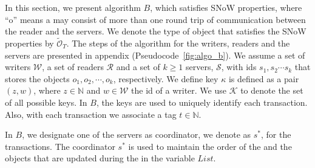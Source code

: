 In this section,  we present  algorithm  $B$, which satisfies  SNoW  properties, where ``o'' means a \rot{} may consist of more than one round trip of communication between the reader and the servers. We denote the type of object  that satisfies the SNoW properties by $\tilde{\mathcal{O}}_T$.   
The steps of the algorithm for the writers, readers and the servers  are presented in appendix (Pseudocode~\ref{fig:algo_b}).
We assume  a set of writers $\mathcal{W}$,  a set of readers $\mathcal{R}$ and a set of $k \geq 1$ servers,  $\mathcal{S}$, with ids $s_1, s_2\cdots s_k$ that stores the objects $o_1, o_2, \cdots, o_k$, respectively.  We define  key ${\kappa}$ is defined as a pair $(z, w)$, 
where $z \in \mathbb{N}$ and $w \in \mathcal{W}$ the  id of a writer. We use $\mathcal{K}$ to denote the set of all possible keys. 
In $B$, the keys are used to uniquely identify each transaction. Also, with each transaction we associate a tag $t \in \mathbb{N}$. 
	
In  $B$, we designate one of the servers as coordinator, we denote as $s^*$,
 for the transactions. The coordinator $s^*$ is used to maintain the order of the \wots{} and the objects that are updated during the \wot{} in the variable $List$.  %

